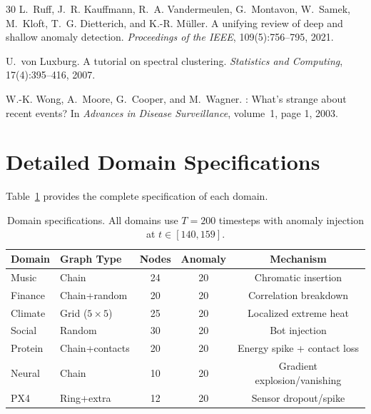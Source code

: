 \documentclass[11pt,a4paper]{article}
\begin{document}
\begin{thebibliography}{30}
L.~Ruff, J.~R. Kauffmann, R.~A. Vandermeulen, G.~Montavon, W.~Samek,
  M.~Kloft, T.~G. Dietterich, and K.-R. M\"{u}ller.
\newblock A unifying review of deep and shallow anomaly detection.
\newblock \emph{Proceedings of the IEEE}, 109(5):756--795, 2021.

U.~von Luxburg.
\newblock A tutorial on spectral clustering.
\newblock \emph{Statistics and Computing}, 17(4):395--416, 2007.

W.-K. Wong, A.~Moore, G.~Cooper, and M.~Wagner.
: What's strange about recent events?
\newblock In \emph{Advances in Disease Surveillance}, volume~1, page 1, 2003.

\end{thebibliography}

\newpage
\appendix

\section{Detailed Domain Specifications}\label{app:domains}

Table~\ref{tab:domain-specs} provides the complete specification of each domain.

\begin{table}[ht]
\centering
\caption{Domain specifications.  All domains use $T=200$ timesteps with anomaly
injection at $t \in [140, 159]$.}
\label{tab:domain-specs}
\begin{tabular}{@{}llccc@{}}
\toprule
\textbf{Domain} & \textbf{Graph Type} & \textbf{Nodes} & \textbf{Anomaly} & \textbf{Mechanism} \\
\midrule
Music     & Chain          & 24 & 20 & Chromatic insertion \\
Finance   & Chain+random   & 20 & 20 & Correlation breakdown \\
Climate   & Grid ($5\times5$) & 25 & 20 & Localized extreme heat \\
Social    & Random         & 30 & 20 & Bot injection \\
Protein   & Chain+contacts & 20 & 20 & Energy spike + contact loss \\
Neural    & Chain          & 10 & 20 & Gradient explosion/vanishing \\
PX4       & Ring+extra     & 12 & 20 & Sensor dropout/spike \\
\bottomrule
\end{tabular}
\end{table}
\end{document}
